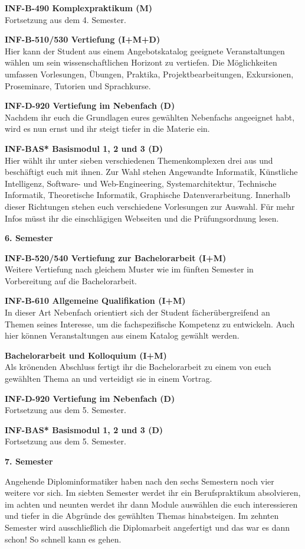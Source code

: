 \textbf{INF-B-490 Komplexpraktikum (M)} \\
Fortsetzung aus dem 4. Semester.

\textbf{INF-B-510/530 Vertiefung (I+M+D)} \\
Hier kann der Student aus einem Angebotskatalog geeignete Veranstaltungen wählen um sein wissenschaftlichen Horizont zu vertiefen.
Die Möglichkeiten umfassen Vorlesungen, Übungen, Praktika, Projektbearbeitungen, Exkursionen, Proseminare, Tutorien und Sprachkurse.

\textbf{INF-D-920 Vertiefung im Nebenfach (D)} \\
Nachdem ihr euch die Grundlagen eures gewählten Nebenfachs angeeignet habt, wird es nun ernst und ihr steigt tiefer in die Materie ein.

\textbf{INF-BAS* Basismodul 1, 2 und 3 (D)} \\
Hier wählt ihr unter sieben verschiedenen Themenkomplexen drei aus und beschäftigt euch mit ihnen.
Zur Wahl stehen Angewandte Informatik, Künstliche Intelligenz, Software- und Web-Engineering, Systemarchitektur, Technische Informatik, Theoretische Informatik, Graphische Datenverarbeitung.
Innerhalb dieser Richtungen stehen euch verschiedene Vorlesungen zur Auswahl.
Für mehr Infos müsst ihr die einschlägigen Webseiten und die Prüfungsordnung lesen.

\textbf{6. Semester}

\textbf{INF-B-520/540 Vertiefung zur Bachelorarbeit (I+M)} \\
Weitere Vertiefung nach gleichem Muster wie im fünften Semester in Vorbereitung auf die Bachelorarbeit.

\textbf{INF-B-610 Allgemeine Qualifikation (I+M)} \\
In dieser Art Nebenfach orientiert sich der Student fächerübergreifend an Themen seines Interesse, um die fachspezifische Kompetenz zu entwickeln.
Auch hier können Veranstaltungen aus einem Katalog gewählt werden.

\textbf{Bachelorarbeit und Kolloquium (I+M)} \\
Als krönenden Abschluss fertigt ihr die Bachelorarbeit zu einem von euch gewählten Thema an und verteidigt sie in einem Vortrag.

\textbf{INF-D-920 Vertiefung im Nebenfach (D)} \\
Fortsetzung aus dem 5. Semester.

\textbf{INF-BAS* Basismodul 1, 2 und 3 (D)} \\
Fortsetzung aus dem 5. Semester.

\textbf{7. Semester}

Angehende Diplominformatiker haben nach den sechs Semestern noch vier weitere vor sich.
Im siebten Semester werdet ihr ein Berufspraktikum absolvieren, im achten und neunten werdet ihr dann Module auswählen die euch interessieren und tiefer in die Abgründe des gewählten Themas hinabsteigen.
Im zehnten Semester wird ausschließlich die Diplomarbeit angefertigt und das war es dann schon!
So schnell kann es gehen.